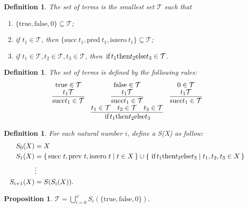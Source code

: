\documentclass{article}
\theoremstyle{plain}
\newtheorem{proposition}[theorem]{Proposition}
\newtheorem{definition}[theorem]{Definition}
\theoremstyle{nonumberplain}
\newcommand\Set[2]{\{\,#1\mid#2\,\}} %
\begin{document}
\begin{definition}
\rm The set of terms is the smallest set $\mathcal{T}$ such that 
\begin{enumerate}
	\item $\{\text{true},\text{false},0\} \subseteq \mathcal{T}$;
	\item if $t_1 \in \mathcal{T}$, then $\{\text{succ}\ t_1, \text{pred}\ t_1, \text{iszero}\ t_1\} \subseteq \mathcal{T}$;
	\item if $t_1 \in \mathcal{T}, t_2 \in \mathcal{T}, t_3 \in \mathcal{T}$, then $\text{\lstinline[mathescape]!if $t_1$ then $t_2$ else $t_3$!} \in \mathcal{T}$.
\end{enumerate}
\end{definition}

\begin{definition}
\rm The set of terms is defined by the following rules:
$$
\begin{array}{ccc}
\text{true} \in \mathcal{T}  & \text{false} \in \mathcal{T} & 0 \in \mathcal{T} \\
\infer{\text{succ} t_1 \in \mathcal{T}}{t_1 \mathcal{T}} & \infer{\text{succ} t_1 \in \mathcal{T}}{t_1 \mathcal{T}} & \infer{\text{succ} t_1 \in \mathcal{T}}{t_1 \mathcal{T}} \\
& \infer{\text{\lstinline[mathescape]!if $t_1$ then $t_2$ else $t_3$!}}{ t_1 \in \mathcal{T} & t_2 \in \mathcal{T} & t_3 \in \mathcal{T}} &\\ 
\end{array}
$$
\end{definition}

\begin{definition}
\rm For each natural number $i$, define a S(X) as follow:
$$
\begin{aligned}
S_0(X)  &= X \\
S_1(X)  &= \Set{\text{succ}\ t,\text{prev}\ t,\text{iszero}\ t }{t \in X} \cup \Set{\text{\lstinline[mathescape]!if $t_1$ then $t_2$ else $t_3$!}}{t_1,t_2,t_3 \in X} \\
&\vdots \\
S_{i+1}(X) &= S(S_i(X)).
\end{aligned}
$$
\end{definition}

\begin{proposition}
\rm $\mathcal{T} = \bigcup_{i = 0}^{\omega} S_i(\{\text{true},\text{false},0\})$.
\end{proposition}
\end{document}
